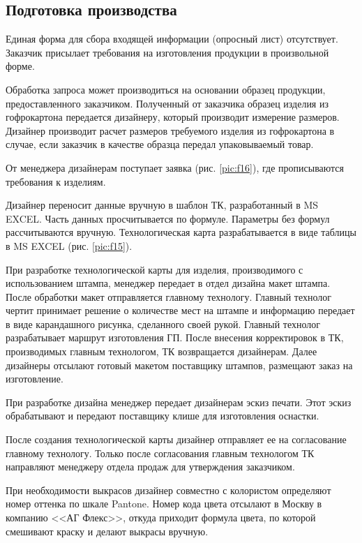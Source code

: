 \subsection{Подготовка производства}
\label{bp:Prepare}
%

Единая форма для сбора входящей информации (опросный лист) отсутствует.
Заказчик присылает требования на изготовления продукции в произвольной форме.

Обработка запроса может производиться на основании образец продукции, предоставленного заказчиком. Полученный от заказчика образец изделия из гофрокартона передается дизайнеру, который производит измерение размеров. Дизайнер производит расчет размеров требуемого изделия из гофрокартона в случае, если заказчик в качестве образца передал упаковываемый товар.

От менеджера дизайнерам поступает заявка (рис. \ref{pic:f16}), где прописываются требования к изделиям. 

Дизайнер переносит данные вручную в шаблон ТК, разработанный в MS EXCEL. Часть данных просчитывается по формуле. Параметры без формул  рассчитываются вручную. Технологическая карта разрабатывается в виде таблицы в MS EXCEL (рис. \ref{pic:f15}).

При разработке технологической карты для изделия, производимого с использованием штампа, менеджер передает в отдел дизайна макет штампа. 
После обработки макет отправляется главному технологу. Главный технолог чертит принимает решение о количестве мест на штампе и информацию передает в виде карандашного рисунка, сделанного своей рукой.
Главный технолог разрабатывает маршрут изготовления ГП. 
После внесения корректировок в ТК, производимых главным технологом, ТК возвращается дизайнерам. Далее дизайнеры отсылают готовый макетом поставщику штампов, размещают заказ на изготовление.

При разработке дизайна менеджер передает дизайнерам эскиз печати. Этот эскиз обрабатывают и передают поставщику клише для изготовления оснастки. 

После создания технологической карты дизайнер отправляет ее на согласование главному технологу. Только после согласования главным технологом ТК направляют менеджеру отдела продаж для утверждения заказчиком. 
  
При необходимости выкрасов дизайнер совместно с колористом определяют номер оттенка по шкале Pantone. Номер кода цвета отсылают в Москву в компанию <<АГ Флекс>>, откуда приходит формула цвета, по которой смешивают краску и делают выкрасы вручную.

